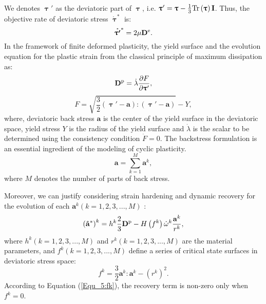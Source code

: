 We denotes $\bm{\uptau}'$ as the deviatoric part of $\bm{\uptau}$, i.e. ${\bm{\uptau}}' = {\bm{\uptau }} - \frac{1}{3}{\rm{Tr}}\left( {\bm{\uptau }} \right){\mathbf{I}}$.
Thus, the objective rate of deviatoric stress ${\mathring {\bm{\uptau }}^{*}}$ is:
\begin{equation}
{\mathring {\bm{\uptau'}}^{*}} = 2\mu {{\mathbf{D}}^{\rm{e}}}.
\end{equation}
In the framework of finite deformed plasticity, the yield surface and the evolution equation for the plastic strain from the classical principle of maximum dissipation as:
\begin{equation}
{{{\mathbf{D}}^{\rm{p}}}} = \dot \lambda \frac{{\partial F}}{{\partial {\bm{\uptau }'}}},
\end{equation}
\begin{equation}
F = \sqrt {\frac{3}{2}\left( {{\bm{\uptau}}' - {\mathbf{a}}} \right):\left( {{\bm{\uptau}}' - {\mathbf{a}}} \right)}  - Y,
\end{equation}
where, deviatoric back stress ${\mathbf{a}}$ is the center of the yield surface in the deviatoric space, yield stress $Y$ is the radius of the yield surface and $\dot \lambda$ is the scalar to be determined using the consistency condition $\dot F = 0$.
The backstress formulation is an essential ingredient of the modeling of cyclic plasticity.
\begin{equation}
{\mathbf{a}} = \sum\limits_{k = 1}^M {{{\mathbf{a}}^k}},
\end{equation}
where $M$ denotes the number of parts of back stress.

Moreover, we can justify considering strain hardening and dynamic recovery for the evolution of each ${{\mathbf{a}}^k} ( k = 1,2,3,...,M )$ :
\begin{equation}
\label{Equ_5:dotak1}
\left({\mathbf{\mathring a}}^{*}\right)^k = {h^k}\frac{2}{3}{{{\mathbf{D}}^{\rm{p}}}} - H\left( {{f^k}} \right){\dot \omega ^k}\frac{{{{\mathbf{a}}^k}}}{{{r^k}}},
\end{equation}
where ${{{h}}^k} ( k = 1,2,3,...,M )$ and ${{{r}}^k} ( k = 1,2,3,...,M )$ are the material parameters, and ${{{f}}^k} ( k = 1,2,3,...,M )$ define a series of critical state surfaces in deviatoric stress space:
\begin{equation}
\label{Equ_5:fk}
{f^k} = \frac{3}{2}{{\mathbf{a}}^k}:{{\mathbf{a}}^k} - {\left( {{r^k}} \right)^2}.
\end{equation}
According to Equation (\ref{Equ_5:fk}), the recovery term is non-zero only when ${f^k} = 0$.

